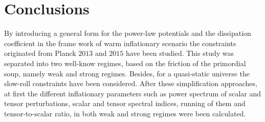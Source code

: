 \documentclass[12pt]{revtex4}
\begin{document}
\section{Conclusions}\label{seccon}
By introducing a general form for the power-law potentials and the dissipation coefficient {in } the frame work of warm inflationary scenario the constraints originated from Planck $2013$ and $2015$ have been studied. This study was separated into two well-know regimes, based on the friction of the primordial soup, namely weak and strong regimes. Besides, for a quasi-static universe the slow-roll constraints have been considered. After these simplification approaches,  at first the different inflationary parameters such as  power spectrum of scalar and tensor perturbations, scalar and tensor spectral indices, running of them and tensor-to-scalar ratio, in both weak and strong regimes {were} been calculated.
\end{document}
